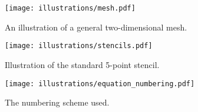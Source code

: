 \begin{figure}[htbp]
  \centering
  \texttt{[image: illustrations/mesh.pdf]}
  \caption{An illustration of a general two-dimensional mesh.}
  \label{fig:mesh}
\end{figure}

\begin{figure}[htbp]
  \centering
  \texttt{[image: illustrations/stencils.pdf]}
  \caption{Illustration of the standard 5-point stencil.}
  \label{fig:stencil}
\end{figure}

\begin{figure}[htbp]
  \centering
  \texttt{[image: illustrations/equation\_numbering.pdf]}
  \caption{The numbering scheme used.}
  \label{fig:numbering_scheme}
\end{figure}


